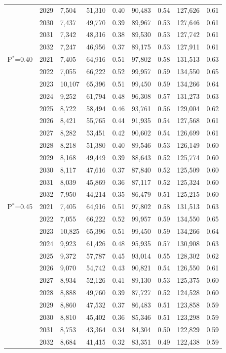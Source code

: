 \documentclass[11pt,
  english,
  a4paper,
]{article}
\begin{document}
\begin{longtable}{lll|ll|ll|ll}
&  2029 & 7,504 & 51,310 & 0.40 & 90,483 & 0.54 & 127,626 & 0.61 \\ 
&  2030 & 7,437 & 49,770 & 0.39 & 89,967 & 0.53 & 127,646 & 0.61 \\ 
&  2031 & 7,342 & 48,316 & 0.38 & 89,530 & 0.53 & 127,742 & 0.61 \\ 
&  2032 & 7,247 & 46,956 & 0.37 & 89,175 & 0.53 & 127,911 & 0.61 \\ 
\hline
P$^*$=0.40
&  2021 & 7,405 & 64,916 & 0.51 & 97,802 & 0.58 & 131,513 & 0.63 \\ 
&  2022 & 7,055 & 66,222 & 0.52 & 99,957 & 0.59 & 134,550 & 0.65 \\ 
& 2023 & 10,107 & 65,396 & 0.51 & 99,450 & 0.59 & 134,266 & 0.64 \\ 
&  2024 & 9,252 & 61,794 & 0.48 & 96,308 & 0.57 & 131,273 & 0.63 \\ 
&  2025 & 8,722 & 58,494 & 0.46 & 93,761 & 0.56 & 129,004 & 0.62 \\ 
& 2026 & 8,421 & 55,765 & 0.44 & 91,935 & 0.54 & 127,568 & 0.61 \\ 
& 2027 & 8,282 & 53,451 & 0.42 & 90,602 & 0.54 & 126,699 & 0.61 \\ 
& 2028 & 8,218 & 51,380 & 0.40 & 89,546 & 0.53 & 126,149 & 0.60 \\
& 2029 & 8,168 & 49,449 & 0.39 & 88,643 & 0.52 & 125,774 & 0.60 \\ 
& 2030 & 8,117 & 47,616 & 0.37 & 87,840 & 0.52 & 125,509 & 0.60 \\ 
& 2031 & 8,039 & 45,869 & 0.36 & 87,117 & 0.52 & 125,324 & 0.60 \\ 
& 2032 & 7,950 & 44,214 & 0.35 & 86,479 & 0.51 & 125,215 & 0.60 \\
\hline
P$^*$=0.45
& 2021 & 7,405 & 64,916 & 0.51 & 97,802 & 0.58 & 131,513 & 0.63 \\ 
& 2022 & 7,055 & 66,222 & 0.52 & 99,957 & 0.59 & 134,550 & 0.65 \\ 
& 2023 & 10,825 & 65,396 & 0.51 & 99,450 & 0.59 & 134,266 & 0.64 \\ 
& 2024 & 9,923 & 61,426 & 0.48 & 95,935 & 0.57 & 130,908 & 0.63 \\ 
& 2025 & 9,372 & 57,787 & 0.45 & 93,014 & 0.55 & 128,302 & 0.62 \\ 
&  2026 & 9,070 & 54,742 & 0.43 & 90,821 & 0.54 & 126,550 & 0.61 \\ 
& 2027 & 8,934 & 52,126 & 0.41 & 89,130 & 0.53 & 125,375 & 0.60 \\ 
&  2028 & 8,888 & 49,760 & 0.39 & 87,727 & 0.52 & 124,528 & 0.60 \\ 
& 2029 & 8,860 & 47,532 & 0.37 & 86,483 & 0.51 & 123,858 & 0.59 \\ 
& 2030 & 8,810 & 45,402 & 0.36 & 85,346 & 0.51 & 123,298 & 0.59 \\ 
&  2031 & 8,753 & 43,364 & 0.34 & 84,304 & 0.50 & 122,829 & 0.59 \\ 
& 2032 & 8,684 & 41,415 & 0.32 & 83,351 & 0.49 & 122,438 & 0.59 \\ 
   \hline
\end{longtable}
\leavevmode\tagmcend\tagstructend\par
\endgroup{}
\endgroup{}
\end{document}
